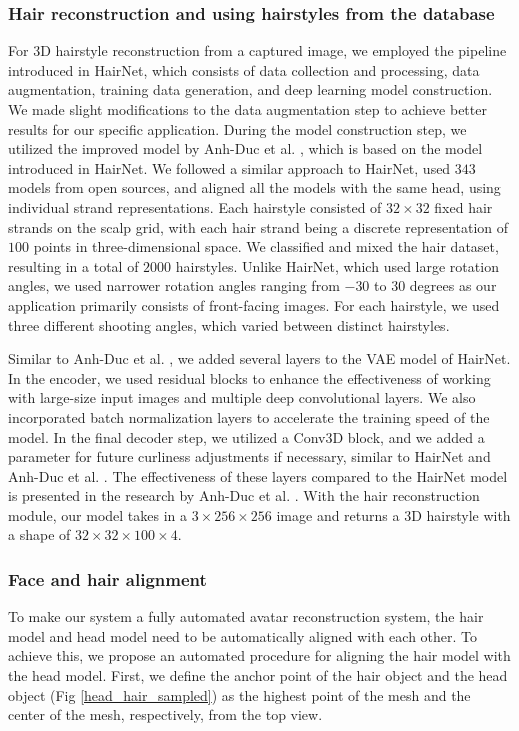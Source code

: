 \subsubsection{Hair reconstruction and using hairstyles from the database}

For 3D hairstyle reconstruction from a captured image, we employed the pipeline introduced in HairNet, which consists of data collection and processing, data augmentation, training data generation, and deep learning model construction. We made slight modifications to the data augmentation step to achieve better results for our specific application. During the model construction step, we utilized the improved model by Anh-Duc et al. \cite{Duc}, which is based on the model introduced in HairNet. We followed a similar approach to HairNet, used $343$ models from open sources, and aligned all the models with the same head, using individual strand representations. Each hairstyle consisted of $32\times32$ fixed hair strands on the scalp grid, with each hair strand being a discrete representation of $100$ points in three-dimensional space. We classified and mixed the hair dataset, resulting in a total of $2000$ hairstyles. Unlike HairNet, which used large rotation angles, we used narrower rotation angles ranging from $-30$ to $30$ degrees as our application primarily consists of front-facing images. For each hairstyle, we used three different shooting angles, which varied between distinct hairstyles.

Similar to Anh-Duc et al. \cite{Duc}, we added several layers to the VAE model of HairNet. In the encoder, we used residual blocks to enhance the effectiveness of working with large-size input images and multiple deep convolutional layers. We also incorporated batch normalization layers to accelerate the training speed of the model. In the final decoder step, we utilized a Conv3D block, and we added a parameter for future curliness adjustments if necessary, similar to HairNet and Anh-Duc et al. \cite{Duc}. The effectiveness of these layers compared to the HairNet model is presented in the research by Anh-Duc et al. \cite{Duc}. With the hair reconstruction module, our model takes in a $3 \times 256 \times 256$ image and returns a 3D hairstyle with a shape of $32 \times 32 \times 100 \times 4$.

\subsubsection{Face and hair alignment}
To make our system a fully automated avatar reconstruction system, the hair model and head model need to be automatically aligned with each other. To achieve this, we propose an automated procedure for aligning the hair model with the head model.
First, we define the anchor point of the hair object and the head object (Fig \ref{head_hair_sampled}) as the highest point of the mesh and the center of the mesh, respectively, from the top view.

